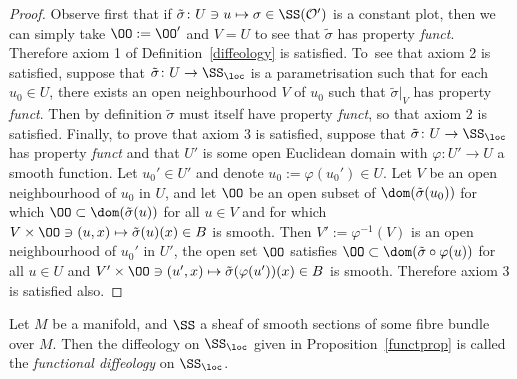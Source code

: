 \begin{proof}
Observe first that if $\tilde{\sigma}\colon U\ni u\mapsto \sigma\in \SS(\mathcal{O}')$ is a constant plot, then we can simply take $\OO:=\OO'$ and $V = U$ to see that $\tilde{\sigma}$ has property \textit{funct}. Therefore axiom 1 of Definition~\ref{diffeology} is satisfied. To~see that axiom 2 is satisfied, suppose that $\tilde{\sigma}\colon U\rightarrow\SS_{\loc}$ is a parametrisation such that for each $u_{0}\in U$, there exists an open neighbourhood $V$ of $u_{0}$ such that $\tilde{\sigma}|_{V}$ has property \textit{funct}. Then by definition $\tilde{\sigma}$ must itself have property \textit{funct}, so that axiom 2 is satisfied. Finally, to prove that axiom 3 is satisfied, suppose that $\tilde{\sigma}\colon U\rightarrow\SS_{\loc}$ has property \textit{funct} and that $U'$ is some open Euclidean domain with $\varphi\colon U'\rightarrow U$ a smooth function. Let $u_{0}'\in U'$ and denote $u_{0}:=\varphi(u_{0}')\in U$. Let $V$ be an open neighbourhood of $u_{0}$ in $U$, and let $\OO$ be an open subset of $\dom(\tilde{\sigma}(u_{0}))$ for which $\OO\subset\dom(\tilde{\sigma}(u))$ for all $u\in V$ and for which $V\times\OO\ni(u,x)\mapsto\tilde{\sigma}(u)(x)\in B$ is smooth. Then $V':=\varphi^{-1}(V)$ is an open neighbourhood of $u_{0}'$ in $U'$, the open set $\OO$ satisfies $\OO\subset\dom(\tilde{\sigma}\circ\varphi(u))$ for all $u\in U$ and $V'\times\OO\ni(u',x)\mapsto\tilde{\sigma}(\varphi(u'))(x)\in B$ is smooth. Therefore axiom 3 is satisfied also.
\end{proof}

\begin{Definition}\label{funl}
Let $M$ be a manifold, and $\SS$ a sheaf of smooth sections of some fibre bundle over $M$. Then the diffeology on $\SS_{\loc}$ given in Proposition~\ref{functprop} is called the \textit{functional diffeology} on $\SS_{\loc}$.
\end{Definition}

